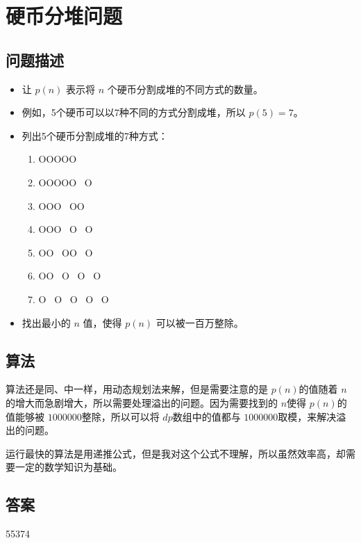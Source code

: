 \section{硬币分堆问题}\label{sec:problem78}
\subsection{问题描述}
\begin{tcolorbox}
	\begin{itemize}
		\item 让 $p(n)$ 表示将 $n$ 个硬币分割成堆的不同方式的数量。
		\item 例如，5个硬币可以以7种不同的方式分割成堆，所以 $p(5) = 7$。
		\item 列出5个硬币分割成堆的7种方式：
		      \begin{enumerate}
			      \item OOOOO
			      \item OOOOO \ O
			      \item OOO \ OO
			      \item OOO \ O \ O
			      \item OO \ OO \ O
			      \item OO \ O \ O \ O
			      \item O \ O \ O \ O \ O
		      \end{enumerate}
		\item 找出最小的 $n$ 值，使得 $p(n)$ 可以被一百万整除。
	\end{itemize}
\end{tcolorbox}

\subsection{算法}
算法还是同、中一样，用动态规划法来解，但是需要注意的是 \( p(n) \)的值随着
\( n \)的增大而急剧增大，所以需要处理溢出的问题。因为需要找到的 \( n \)使得 \( p(n) \)的值能够被 \( \num{1000000}
\)整除，所以可以将 \( dp \)数组中的值都与 \( \num{1000000} \)取模，来解决溢出的问题。

运行最快的算法是用递推公式，但是我对这个公式不理解，所以虽然效率高，却需要一定的数学知识为基础。
\subsection{答案}
55374
